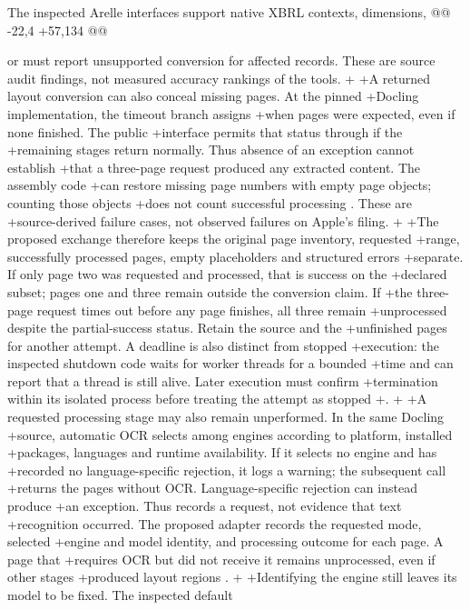  The inspected Arelle interfaces support native XBRL contexts, dimensions,
@@ -22,4 +57,134 @@

 or must report unsupported conversion for affected records. These are source
 audit findings, not measured accuracy rankings of the tools.
+
+A returned layout conversion can also conceal missing pages. At the pinned
+Docling implementation, the timeout branch assigns 
+when pages were expected, even if none finished. The public 
+interface permits that status through  if the
+remaining stages return normally. Thus absence of an exception cannot establish
+that a three-page request produced any extracted content. The assembly code
+can restore missing page numbers with empty page objects; counting those objects
+does not count successful processing \citep{doclingpinned2026}. These are
+source-derived failure cases, not observed failures on Apple's filing.
+
+The proposed exchange therefore keeps the original page inventory, requested
+range, successfully processed pages, empty placeholders and structured errors
+separate. If only page two was requested and processed, that is success on the
+declared subset; pages one and three remain outside the conversion claim. If
+the three-page request times out before any page finishes, all three remain
+unprocessed despite the partial-success status. Retain the source and the
+unfinished pages for another attempt. A deadline is also distinct from stopped
+execution: the inspected shutdown code waits for worker threads for a bounded
+time and can report that a thread is still alive. Later execution must confirm
+termination within its isolated process before treating the attempt as stopped
+\citep{doclingpinned2026}.
+
+A requested processing stage may also remain unperformed. In the same Docling
+source, automatic OCR selects among engines according to platform, installed
+packages, languages and runtime availability. If it selects no engine and has
+recorded no language-specific rejection, it logs a warning; the subsequent call
+returns the pages without OCR. Language-specific rejection can instead produce
+an exception. Thus  records a request, not evidence that text
+recognition occurred. The proposed adapter records the requested mode, selected
+engine and model identity, and processing outcome for each page. A page that
+requires OCR but did not receive it remains unprocessed, even if other stages
+produced layout regions \citep{doclingpinned2026}.
+
+Identifying the engine still leaves its model to be fixed. The inspected default
